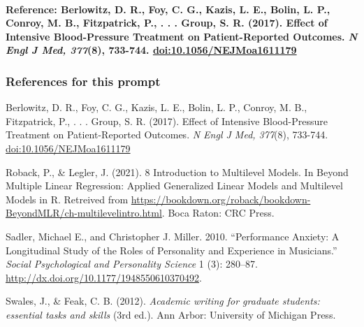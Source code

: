 \documentclass[
  openany]{book}
\begin{document}
\hypertarget{reference-berlowitz-d.-r.-foy-c.-g.-kazis-l.-e.-bolin-l.-p.-conroy-m.-b.-fitzpatrick-p.-.-.-.-group-s.-r.-2017.-effect-of-intensive-blood-pressure-treatment-on-patient-reported-outcomes.-n-engl-j-med-3778-733-744.-doi10.1056nejmoa1611179}{%
\paragraph{\texorpdfstring{Reference: Berlowitz, D. R., Foy, C. G., Kazis, L. E., Bolin, L. P., Conroy, M. B., Fitzpatrick, P., . . . Group, S. R. (2017). Effect of Intensive Blood-Pressure Treatment on Patient-Reported Outcomes. \emph{N Engl J Med, 377}(8), 733-744. \url{doi:10.1056/NEJMoa1611179}}{Reference: Berlowitz, D. R., Foy, C. G., Kazis, L. E., Bolin, L. P., Conroy, M. B., Fitzpatrick, P., . . . Group, S. R. (2017). Effect of Intensive Blood-Pressure Treatment on Patient-Reported Outcomes. N Engl J Med, 377(8), 733-744. doi:10.1056/NEJMoa1611179}}\label{reference-berlowitz-d.-r.-foy-c.-g.-kazis-l.-e.-bolin-l.-p.-conroy-m.-b.-fitzpatrick-p.-.-.-.-group-s.-r.-2017.-effect-of-intensive-blood-pressure-treatment-on-patient-reported-outcomes.-n-engl-j-med-3778-733-744.-doi10.1056nejmoa1611179}}

\hypertarget{references-for-this-prompt}{%
\subsubsection{References for this prompt}\label{references-for-this-prompt}}

Berlowitz, D. R., Foy, C. G., Kazis, L. E., Bolin, L. P., Conroy, M. B., Fitzpatrick, P., . . . Group, S. R. (2017). Effect of Intensive Blood-Pressure Treatment on Patient-Reported Outcomes. \emph{N Engl J Med, 377}(8), 733-744. \url{doi:10.1056/NEJMoa1611179}

Roback, P., \& Legler, J. (2021). 8 Introduction to Multilevel Models. In Beyond Multiple Linear Regression: Applied Generalized Linear Models and Multilevel Models in R. Retreived from \url{https://bookdown.org/roback/bookdown-BeyondMLR/ch-multilevelintro.html}. Boca Raton: CRC Press.

Sadler, Michael E., and Christopher J. Miller. 2010. ``Performance Anxiety: A Longitudinal Study of the Roles of Personality and Experience in Musicians.'' \emph{Social Psychological and Personality Science} 1 (3): 280--87. \url{http://dx.doi.org/10.1177/1948550610370492}.

Swales, J., \& Feak, C. B. (2012). \emph{Academic writing for graduate students: essential tasks and skills} (3rd ed.). Ann Arbor: University of Michigan Press.
\end{document}
